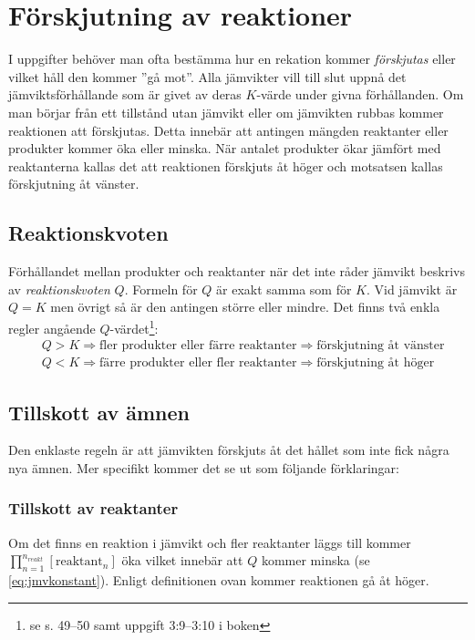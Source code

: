 \newpage
\section{Förskjutning av reaktioner}

I uppgifter behöver man ofta bestämma hur en rekation kommer \emph{förskjutas} eller vilket håll den kommer ''gå mot''. Alla jämvikter vill till slut uppnå det jämviktsförhållande som är givet av deras $K$-värde under givna förhållanden. Om man börjar från ett tillstånd utan jämvikt eller om jämvikten rubbas kommer reaktionen att förskjutas. Detta innebär att antingen mängden reaktanter eller produkter kommer öka eller minska. När antalet produkter ökar jämfört med reaktanterna kallas det att reaktionen förskjuts åt höger och motsatsen kallas förskjutning åt vänster.

\subsection{Reaktionskvoten}

Förhållandet mellan produkter och reaktanter när det inte råder jämvikt beskrivs av \emph{reaktionskvoten} $Q$. Formeln för $Q$ är exakt samma som för $K$. Vid jämvikt är $Q=K$ men övrigt så är den antingen större eller mindre. Det finns två enkla regler angående $Q$-värdet\footnote{se s. 49--50 samt uppgift 3:9--3:10 i boken}:
\begin{align*}
    &Q > K \Rightarrow \text{fler produkter eller färre reaktanter} \Rightarrow \text{förskjutning åt vänster} \\
    &Q < K \Rightarrow \text{färre produkter eller fler reaktanter} \Rightarrow \text{förskjutning åt höger}
\end{align*}

\subsection{Tillskott av ämnen}
Den enklaste regeln är att jämvikten förskjuts åt det hållet som inte fick några nya ämnen. Mer specifikt kommer det se ut som följande förklaringar:

\subsubsection[Reaktanter]{Tillskott av reaktanter}
Om det finns en reaktion i jämvikt och fler reaktanter läggs till kommer $\prod^{n_{reakt}}_{n=1}[\mathrm{reaktant}_n]$ öka vilket innebär att $Q$ kommer minska (se \cref{eq:jmvkonstant}). Enligt definitionen ovan kommer reaktionen gå åt höger.
